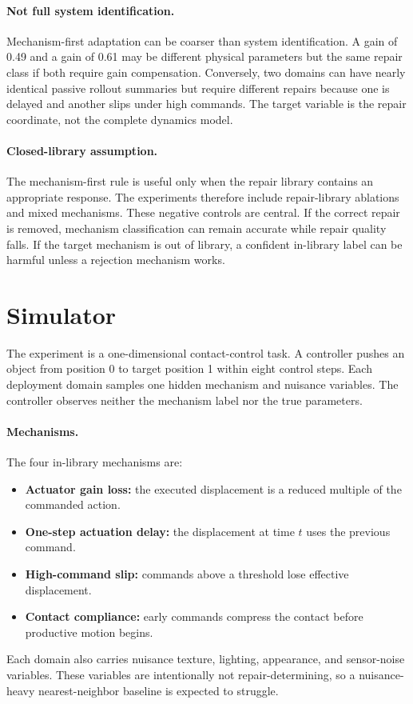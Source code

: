 \documentclass{article}
\begin{document}
\paragraph{Not full system identification.}
Mechanism-first adaptation can be coarser than system identification. A gain of
0.49 and a gain of 0.61 may be different physical parameters but the same repair
class if both require gain compensation. Conversely, two domains can have nearly
identical passive rollout summaries but require different repairs because one is
delayed and another slips under high commands. The target variable is the repair
coordinate, not the complete dynamics model.

\paragraph{Closed-library assumption.}
The mechanism-first rule is useful only when the repair library contains an
appropriate response. The experiments therefore include repair-library ablations
and mixed mechanisms. These negative controls are central. If the correct repair
is removed, mechanism classification can remain accurate while repair quality
falls. If the target mechanism is out of library, a confident in-library label
can be harmful unless a rejection mechanism works.

\section{Simulator}

The experiment is a one-dimensional contact-control task. A controller pushes an
object from position 0 to target position 1 within eight control steps. Each
deployment domain samples one hidden mechanism and nuisance variables. The
controller observes neither the mechanism label nor the true parameters.

\paragraph{Mechanisms.}
The four in-library mechanisms are:
\begin{itemize}
    \item \textbf{Actuator gain loss:} the executed displacement is a reduced
    multiple of the commanded action.
    \item \textbf{One-step actuation delay:} the displacement at time $t$ uses
    the previous command.
    \item \textbf{High-command slip:} commands above a threshold lose effective
    displacement.
    \item \textbf{Contact compliance:} early commands compress the contact
    before productive motion begins.
\end{itemize}
Each domain also carries nuisance texture, lighting, appearance, and sensor-noise
variables. These variables are intentionally not repair-determining, so a
nuisance-heavy nearest-neighbor baseline is expected to struggle.
\end{document}
